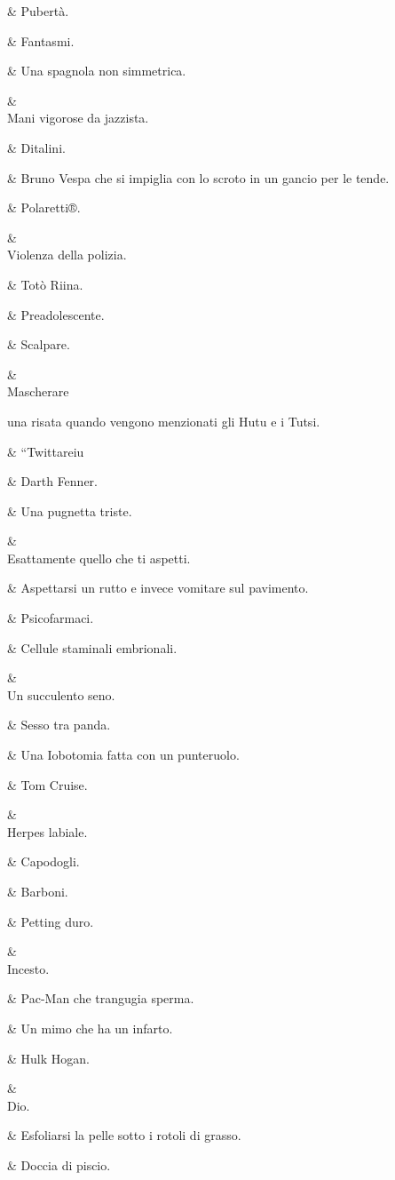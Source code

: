 &
Pubertà.

&
Fantasmi.

&
Una spagnola
non simmetrica.

&
\\
Mani vigorose da
jazzista.

&
Ditalini.

&
Bruno Vespa
che si impiglia
con lo scroto in
un gancio per le
tende.

&
Polaretti®.

&
\\
Violenza della
polizia.

&
Totò Riina.

&
Preadolescente.

&
Scalpare.

&
\\
Mascherare

una risata
quando vengono
menzionati gli
Hutu e i Tutsi.

&
“Twittareiu

&
Darth Fenner.

&
Una pugnetta
triste.

&
\\
Esattamente
quello che ti
aspetti.

&
Aspettarsi un
rutto e invece
vomitare sul
pavimento.

&
Psicofarmaci.

&
Cellule staminali
embrionali.

&
\\
Un succulento
seno.

&
Sesso tra panda.

&
Una Iobotomia
fatta con un
punteruolo.

&
Tom Cruise.

&
\\
Herpes labiale.

&
Capodogli.

&
Barboni.

&
Petting duro.

&
\\
Incesto.

&
Pac-Man che
trangugia
sperma.

&
Un mimo che ha
un infarto.

&
Hulk Hogan.

&
\\
Dio.

&
Esfoliarsi la pelle
sotto i rotoli di
grasso.

&
Doccia di piscio.

